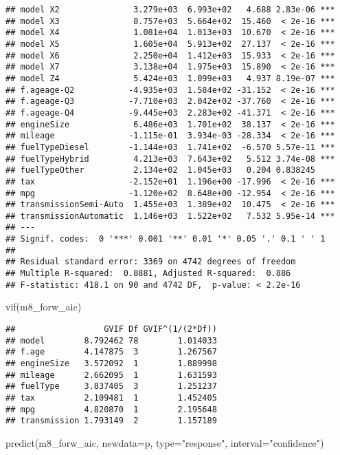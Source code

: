 \documentclass[
]{article}
\newenvironment{Shaded}{\begin{snugshade}}{\end{snugshade}}
\newcommand{\AttributeTok}[1]{\textcolor[rgb]{0.77,0.63,0.00}{#1}}
\newcommand{\FunctionTok}[1]{\textcolor[rgb]{0.00,0.00,0.00}{#1}}
\newcommand{\NormalTok}[1]{#1}
\newcommand{\StringTok}[1]{\textcolor[rgb]{0.31,0.60,0.02}{#1}}
\begin{document}
\begin{verbatim}
## model X2               3.279e+03  6.993e+02   4.688 2.83e-06 ***
## model X3               8.757e+03  5.664e+02  15.460  < 2e-16 ***
## model X4               1.081e+04  1.013e+03  10.670  < 2e-16 ***
## model X5               1.605e+04  5.913e+02  27.137  < 2e-16 ***
## model X6               2.250e+04  1.412e+03  15.933  < 2e-16 ***
## model X7               3.138e+04  1.975e+03  15.890  < 2e-16 ***
## model Z4               5.424e+03  1.099e+03   4.937 8.19e-07 ***
## f.ageage-Q2           -4.935e+03  1.584e+02 -31.152  < 2e-16 ***
## f.ageage-Q3           -7.710e+03  2.042e+02 -37.760  < 2e-16 ***
## f.ageage-Q4           -9.445e+03  2.283e+02 -41.371  < 2e-16 ***
## engineSize             6.486e+03  1.701e+02  38.137  < 2e-16 ***
## mileage               -1.115e-01  3.934e-03 -28.334  < 2e-16 ***
## fuelTypeDiesel        -1.144e+03  1.741e+02  -6.570 5.57e-11 ***
## fuelTypeHybrid         4.213e+03  7.643e+02   5.512 3.74e-08 ***
## fuelTypeOther          2.134e+02  1.045e+03   0.204 0.838245    
## tax                   -2.152e+01  1.196e+00 -17.996  < 2e-16 ***
## mpg                   -1.120e+02  8.648e+00 -12.954  < 2e-16 ***
## transmissionSemi-Auto  1.455e+03  1.389e+02  10.475  < 2e-16 ***
## transmissionAutomatic  1.146e+03  1.522e+02   7.532 5.95e-14 ***
## ---
## Signif. codes:  0 '***' 0.001 '**' 0.01 '*' 0.05 '.' 0.1 ' ' 1
## 
## Residual standard error: 3369 on 4742 degrees of freedom
## Multiple R-squared:  0.8881, Adjusted R-squared:  0.886 
## F-statistic: 418.1 on 90 and 4742 DF,  p-value: < 2.2e-16
\end{verbatim}

\begin{Shaded}
\begin{Highlighting}[]
\FunctionTok{vif}\NormalTok{(m8\_forw\_aic)}
\end{Highlighting}
\end{Shaded}

\begin{verbatim}
##                  GVIF Df GVIF^(1/(2*Df))
## model        8.792462 78        1.014033
## f.age        4.147875  3        1.267567
## engineSize   3.572092  1        1.889998
## mileage      2.662095  1        1.631593
## fuelType     3.837405  3        1.251237
## tax          2.109481  1        1.452405
## mpg          4.820870  1        2.195648
## transmission 1.793149  2        1.157189
\end{verbatim}

\begin{Shaded}
\begin{Highlighting}[]
\FunctionTok{predict}\NormalTok{(m8\_forw\_aic, }\AttributeTok{newdata=}\NormalTok{p, }\AttributeTok{type=}\StringTok{"response"}\NormalTok{, }\AttributeTok{interval=}\StringTok{"confidence"}\NormalTok{)}
\end{Highlighting}
\end{Shaded}
\end{document}
